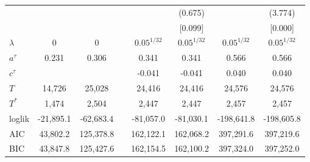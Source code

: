 \documentclass[a4paper,12pt]{article}
\begin{document}
\begin{table}[tb]
{\begin{tabular}{l c c c c c c c}
	&	    	&	    	 & &         & (0.675)  &          & (3.774)    	\\
	&	     	&	     	 & &         & [0.099]  &          & [0.000]	  	\\
\hline
\rule{0pt}{2ex}
$\lambda$&	0	&	0	     & &$0.05^{1/32}$&$0.05^{1/32}$&$0.05^{1/32}$&$0.05^{1/32}$	\\
$a^\tau$ &0.231 &   0.306	 & & 0.341 & 0.341 & 0.566 & 0.566		\\
$c^\tau$ &      &            & &-0.041 &-0.041 & 0.040 & 0.040      \\
\hline
\rule{0pt}{2ex}
$T$     &     14,726 &     25,028    & &  24,416   & 24,416   & 24,576	   & 24,576      \\
$T^*$   &      1,474 &      2,504    & &  2,447    & 2,447    &  2,457    &  2,457      \\
\hline
loglik  &  -21,895.1 &  -62,683.4    & &  -81,057.0& -81,030.1&-198,641.8 &	-198,605.8  \\
AIC     &   43,802.2 &   125,378.8   & &  162,122.1& 162,068.2& 397,291.6 &	397,219.6   \\
BIC     &   43,847.8 &   125,427.6   & &  162,154.5& 162,100.2& 397,324.0 &	397,252.0   \\
\hline \hline
\end{tabular}
}
\end{table}




\end{document}
